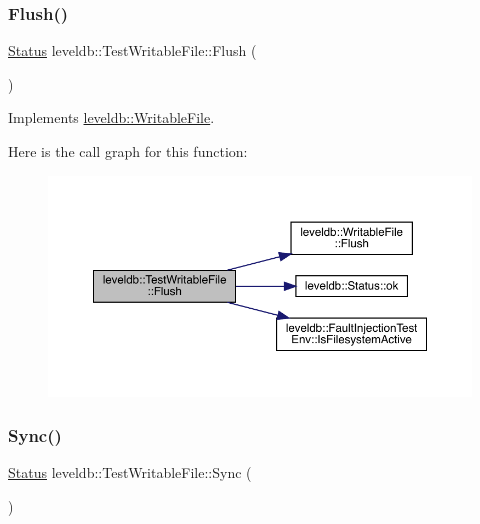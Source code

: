 \subsubsection{\texorpdfstring{Flush()}{Flush()}}
{\footnotesize\ttfamily \mbox{\hyperlink{classleveldb_1_1_status}{Status}} leveldb\+::\+Test\+Writable\+File\+::\+Flush (\begin{DoxyParamCaption}{ }\end{DoxyParamCaption})\hspace{0.3cm}{\ttfamily [virtual]}}



Implements \mbox{\hyperlink{classleveldb_1_1_writable_file_ab95759ad32f6a05b0ee4266969fa265e}{leveldb\+::\+Writable\+File}}.

Here is the call graph for this function\+:
\nopagebreak
\begin{figure}[H]
\begin{center}
\leavevmode
\includegraphics[width=350pt]{classleveldb_1_1_test_writable_file_ad25b85a5ef462fe34e208f955c19d58e_cgraph}
\end{center}
\end{figure}
\mbox{\label{classleveldb_1_1_test_writable_file_aae96a812f1f2e82563b0900dfffaf1d1}} 
\subsubsection{\texorpdfstring{Sync()}{Sync()}}
{\footnotesize\ttfamily \mbox{\hyperlink{classleveldb_1_1_status}{Status}} leveldb\+::\+Test\+Writable\+File\+::\+Sync (\begin{DoxyParamCaption}{ }\end{DoxyParamCaption})\hspace{0.3cm}{\ttfamily [virtual]}}



